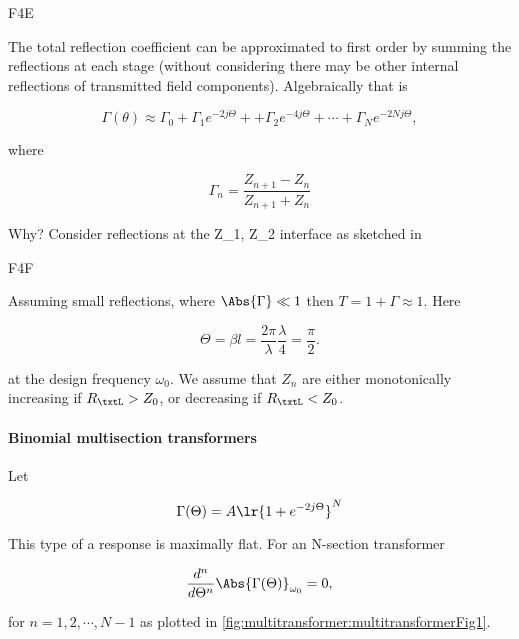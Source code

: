 F4E

The total reflection coefficient can be approximated to first order by summing the reflections at each stage (without considering there may be other internal reflections of transmitted field components).  Algebraically that is

\begin{equation}\label{eqn:uwavesDeck7MultisectionTransformersCore:60}
\Gamma(\theta) \approx \Gamma_0 
+ \Gamma_1 e^{-2 j \Theta} + 
+ \Gamma_2 e^{-4 j \Theta} +  \cdots
+ \Gamma_N e^{-2 N j \Theta},
\end{equation}

where

\begin{equation}\label{eqn:uwavesDeck7MultisectionTransformersCore:80}
\Gamma_n = \frac{Z_{n+1} - Z_n}{Z_{n+1} + Z_n}
\end{equation}

Why?  Consider reflections at the Z_1, Z_2 interface as sketched in

F4F

Assuming small reflections, where \( \Abs{\Gamma} \ll 1 \) then \( T = 1 + \Gamma \approx 1 \).  Here

\begin{dmath}\label{eqn:uwavesDeck7MultisectionTransformersCore:100}
\Theta 
= \beta l 
= \frac{2 \pi}{\lambda} \frac{\lambda}{4} 
= \frac{\pi}{2}.
\end{dmath}

at the design frequency \( \omega_0 \).  We assume that \( Z_n \) are either monotonically increasing if \( R_\txtL > Z_0 \), or decreasing if \( R_\txtL < Z_0 \).

\paragraph{Binomial multisection transformers}

Let

\begin{equation}\label{eqn:uwavesDeck7MultisectionTransformersCore:120}
\Gamma(\Theta) = A \lr{ 1 + e^{-2 j \Theta} }^N
\end{equation}

This type of a response is maximally flat.  For an N-section transformer

\begin{equation}\label{eqn:uwavesDeck7MultisectionTransformersCore:140}
\frac{d^n}{d\Theta^n} \Abs{\Gamma(\Theta)}_{\omega_0} = 0,
\end{equation}

for \( n = 1, 2, \cdots, N-1 \) as plotted in \cref{fig:multitransformer:multitransformerFig1}.



